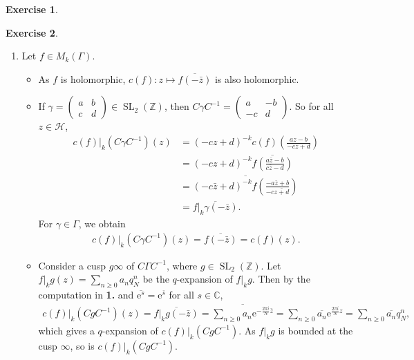 \documentclass{article}
\theoremstyle{definition}
\newtheorem{example}{Exercise}
\theoremstyle{remark}
\newcommand{\C}{\mathbb{C}}
\newcommand{\Z}{\mathbb{Z}}
\DeclareMathOperator{\SL}{SL}
\newcommand{\e}{\mathrm{e}}
\begin{document}
\begin{example}
\begin{enumerate}
\end{enumerate}
\end{example}

\begin{example}
\begin{enumerate}
    \item Let $f\in M_k(\Gamma)$.
    \begin{itemize}
        \item As $f$ is holomorphic, $c(f) : z\mapsto \overline{f(-\bar{z})}$ is also holomorphic.
        \item If $\gamma = \begin{pmatrix}
            a & b\\ c&d
        \end{pmatrix}\in\SL_2(\Z)$, then $C\gamma C^{-1} = \begin{pmatrix}
            a&-b\\ -c&d
        \end{pmatrix}$.
        So for all $z\in\mathcal{H}$, \begin{align*}
            c(f)|_k (C\gamma C^{-1}) (z)
            &= (-cz+d)^{-k} c(f)\left(\frac{az-b}{-cz+d}\right) 
            \\ &= (-cz+d)^{-k} \overline{f\left( 
                \frac{a\bar{z} - b}{c\bar{z} - d}
             \right)}
            \\ &= \overline{(-c\bar{z} + d)^{-k}f\left( \frac{-a\bar{z} + b}{-c\bar{z + d}} \right)}
            \\ &= \overline{f|_k \gamma (-\bar{z})}.
        \end{align*}
        For $\gamma\in\Gamma$, we obtain\begin{align*}
            c(f)|_k (C\gamma C^{-1}) (z)= \overline{f(-\bar{z})} = c(f)(z).
        \end{align*}
\item 
Consider a cusp $g\infty$ of $C\Gamma C^{-1}$, where
$g\in\SL_2(\Z)$.
Let $f|_kg(z) = \sum_{n\ge 0}a_nq_N^n$ be the $q$-expansion of $f|_kg$.
Then by the computation in \textbf{1.} and $\overline{\e^s} = \e^{\bar{s}}$ for all $s\in\C$,
\begin{align}\label{q-exp of c(f)}
    c(f)|_k(CgC^{-1})(z) 
    = \overline{f|_kg (-\bar{z})}
    = \overline{\sum_{n\ge 0} a_n\e^{-\frac{2\pi i}{N}\bar{z}}}
        = \sum_{n\ge 0}\overline{a_n}\e^{\frac{2\pi i}{N}z} = \sum_{n\ge 0}\overline{a_n}q_N^n,
\end{align}
which gives a $q$-expansion of $c(f)|_k(CgC^{-1})$.
As $f|_kg$ is bounded at the cusp $\infty$, so is $c(f)|_k(CgC^{-1})$.

\end{itemize}
\end{enumerate}
\end{example}
\end{document}
